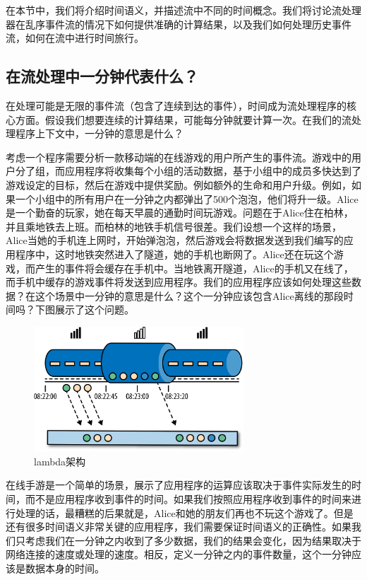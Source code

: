 \documentclass[cn,11pt,chinese]{elegantbook}
\begin{document}
在本节中，我们将介绍时间语义，并描述流中不同的时间概念。我们将讨论流处理器在乱序事件流的情况下如何提供准确的计算结果，以及我们如何处理历史事件流，如何在流中进行时间旅行。

\subsection{在流处理中一分钟代表什么？}

在处理可能是无限的事件流（包含了连续到达的事件），时间成为流处理程序的核心方面。假设我们想要连续的计算结果，可能每分钟就要计算一次。在我们的流处理程序上下文中，一分钟的意思是什么？

考虑一个程序需要分析一款移动端的在线游戏的用户所产生的事件流。游戏中的用户分了组，而应用程序将收集每个小组的活动数据，基于小组中的成员多快达到了游戏设定的目标，然后在游戏中提供奖励。例如额外的生命和用户升级。例如，如果一个小组中的所有用户在一分钟之内都弹出了500个泡泡，他们将升一级。Alice是一个勤奋的玩家，她在每天早晨的通勤时间玩游戏。问题在于Alice住在柏林，并且乘地铁去上班。而柏林的地铁手机信号很差。我们设想一个这样的场景，Alice当她的手机连上网时，开始弹泡泡，然后游戏会将数据发送到我们编写的应用程序中，这时地铁突然进入了隧道，她的手机也断网了。Alice还在玩这个游戏，而产生的事件将会缓存在手机中。当地铁离开隧道，Alice的手机又在线了，而手机中缓存的游戏事件将发送到应用程序。我们的应用程序应该如何处理这些数据？在这个场景中一分钟的意思是什么？这个一分钟应该包含Alice离线的那段时间吗？下图展示了这个问题。

\begin{figure}[htbp]
    \centering
    \includegraphics[width=0.7\textwidth]{images/spaf_0211.png}
    \caption{lambda架构}
\end{figure}

在线手游是一个简单的场景，展示了应用程序的运算应该取决于事件实际发生的时间，而不是应用程序收到事件的时间。如果我们按照应用程序收到事件的时间来进行处理的话，最糟糕的后果就是，Alice和她的朋友们再也不玩这个游戏了。但是还有很多时间语义非常关键的应用程序，我们需要保证时间语义的正确性。如果我们只考虑我们在一分钟之内收到了多少数据，我们的结果会变化，因为结果取决于网络连接的速度或处理的速度。相反，定义一分钟之内的事件数量，这个一分钟应该是数据本身的时间。
\end{document}
